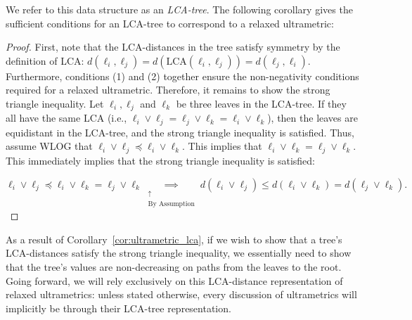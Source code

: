We refer to this data structure as an \emph{LCA-tree}. The following corollary gives the sufficient conditions for an LCA-tree to correspond to a relaxed ultrametric:

\LCAcorollary*
\begin{proof}

    First, note that the LCA-distances in the tree satisfy symmetry by the definition of LCA: $d(\ell_i, \ell_j) = d(\text{LCA}(\ell_i, \ell_j)) = d(\ell_j, \ell_i)$. Furthermore, conditions (1) and (2) together ensure the
    non-negativity conditions required for a relaxed ultrametric. Therefore, it remains to show the strong triangle inequality. Let $\ell_i, \ell_j$ and $\ell_k$
    be three leaves in the LCA-tree. If they all have the same LCA (i.e., $\ell_i \lor \ell_j = \ell_j \lor \ell_k = \ell_i \lor \ell_k$), then the leaves are
    equidistant in the LCA-tree, and the strong triangle inequality is satisfied. Thus, assume WLOG that $\ell_i \lor \ell_j \preceq \ell_i \lor \ell_k$. This
    implies that $\ell_i \lor \ell_k = \ell_j \lor \ell_k$. This immediately implies that the strong triangle inequality is satisfied:

    \[ \ell_i \lor \ell_j \preceq \ell_i \lor \ell_k = \ell_j \lor \ell_k \underset{\substack{\uparrow\\\text{By Assumption}}}{\implies} d(\ell_i \lor \ell_j)
    \leq d(\ell_i \lor \ell_k) = d(\ell_j \lor \ell_k). \]

\end{proof}

\noindent As a result of Corollary~\ref{cor:ultrametric_lca}, if we wish to show that a tree's LCA-distances satisfy the strong triangle inequality, we
essentially need to show that the tree's values are non-decreasing on paths from the leaves to the root. Going forward, we will rely exclusively on this
LCA-distance representation of relaxed ultrametrics: unless stated otherwise, every discussion of ultrametrics will implicitly be through their LCA-tree
representation. 

